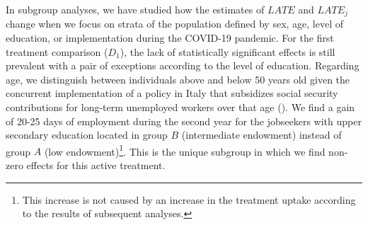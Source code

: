 \documentclass[
  11pt]{article}
\begin{document}
In subgroup analyses, we have studied how the estimates of \(LATE\) and
\(LATE_j\) change when we focus on strata of the population defined by
sex, age, level of education, or implementation during the COVID-19
pandemic. For the first treatment comparison (\(D_1\)), the lack of
statistically significant effects is still prevalent with a pair of
exceptions according to the level of education. Regarding age, we
distinguish between individuals above and below 50 years old given the
concurrent implementation of a policy in Italy that subsidizes social
security contributions for long-term unemployed workers over that age
(). We find a gain
of 20-25 days of employment during the second year for the jobseekers
with upper secondary education located in group \(B\) (intermediate
endowment) instead of group \(A\) (low endowment)\footnote{This increase
  is not caused by an increase in the treatment uptake according to the
  results of subsequent analyses.}. This is the unique subgroup in which
we find non-zero effects for this active treatment.
\end{document}

